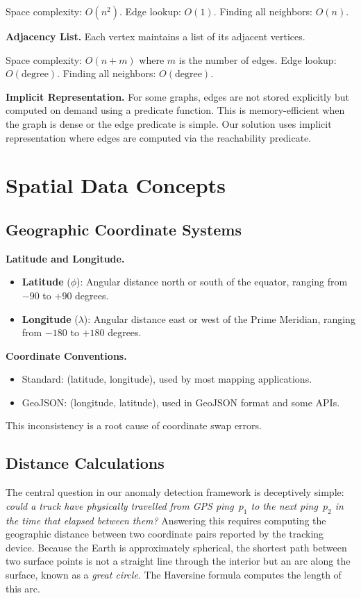 \noindent Space complexity: $O(n^2)$. Edge lookup: $O(1)$. Finding all neighbors: $O(n)$.

\textbf{Adjacency List.} Each vertex maintains a list of its adjacent vertices.

\noindent Space complexity: $O(n + m)$ where $m$ is the number of edges. Edge lookup: $O(\text{degree})$. Finding all neighbors: $O(\text{degree})$.

\textbf{Implicit Representation.} For some graphs, edges are not stored explicitly but computed on demand using a predicate function. This is memory-efficient when the graph is dense or the edge predicate is simple. Our solution uses implicit representation where edges are computed via the reachability predicate.

\section{Spatial Data Concepts}

\subsection{Geographic Coordinate Systems}

\textbf{Latitude and Longitude.}
\begin{itemize}
    \item \textbf{Latitude} ($\phi$): Angular distance north or south of the equator, ranging from $-90$ to $+90$ degrees.
    \item \textbf{Longitude} ($\lambda$): Angular distance east or west of the Prime Meridian, ranging from $-180$ to $+180$ degrees.
\end{itemize}

\textbf{Coordinate Conventions.}
\begin{itemize}
    \item Standard: (latitude, longitude), used by most mapping applications.
    \item GeoJSON: (longitude, latitude), used in GeoJSON format and some APIs.
\end{itemize}
This inconsistency is a root cause of coordinate swap errors.

\subsection{Distance Calculations}

The central question in our anomaly detection framework is deceptively simple: \textit{could a truck have physically travelled from GPS ping~$p_1$ to the next ping~$p_2$ in the time that elapsed between them?} Answering this requires computing the geographic distance between two coordinate pairs reported by the tracking device. Because the Earth is approximately spherical, the shortest path between two surface points is not a straight line through the interior but an arc along the surface, known as a \textit{great circle}. The Haversine formula computes the length of this arc.

